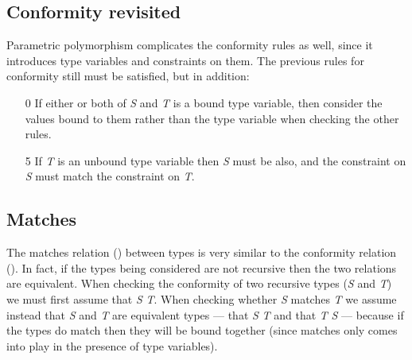\subsection{Conformity revisited}
Parametric polymorphism complicates the conformity rules as well, since it
introduces type variables and constraints on them.  The previous rules for
conformity still must be satisfied, but in addition:
\begin{enumerate}
  \item[0]{} If either or both of {\it S} and {\it T} is a bound type
    variable, then consider the values bound to them rather than the type
    variable when checking the other rules.
  \item[5]{} If {\it T} is an unbound type variable then {\it S} must be
    also, and the constraint on {\it S} must match the constraint on {\it T}.
\end{enumerate}
\subsection{Matches}
The matches relation (\matches{}) between types is very similar to the
conformity relation (\conforms{}).  In fact, if the types being considered
are not recursive then the two relations are equivalent.  When checking the
conformity of two recursive types ({\it S} and {\it T}) we must
first assume that {\it S} \conforms{} {\it T}.  When checking whether {\it
S} matches {\it T} we assume instead that {\it S} and {\it T} are equivalent
types ---  that {\it S} \conforms{} {\it T} and that {\it T} \conforms{} {\it
S} --- because if the types do match then they will be bound together (since
matches only comes into play in the presence of type variables).

